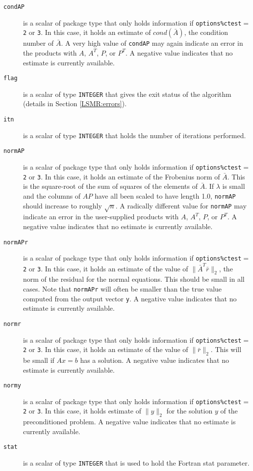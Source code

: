 \begin{description}

\item[\texttt{condAP}]  is a scalar of package type that
   only holds information if {\tt options\%ctest}$ =${\tt 2} or {\tt 3}.
   In this case, it holds an estimate of $cond(\bar{A})$, the condition
   number of $\bar{A}$.  A very high value of {\tt condAP}
   may again indicate an error in the products 
   with $A$, $A^T$, $P$, or $P^T$. A negative value indicates
   that no estimate is currently available.

\item[\texttt{flag}] is a scalar of type  {\tt INTEGER} that gives the exit
   status of the algorithm (details in Section \ref{LSMR:errors}).

\item[\texttt{itn}] is a scalar of type  {\tt INTEGER} that holds the number
   of iterations performed.

\item[\texttt{normAP}]  is a scalar of package type that
   only holds information if {\tt options\%ctest}$ =${\tt 2} or {\tt 3}.
   In this case, it holds an estimate of the Frobenius norm of $\bar{A}$.
   This is the square-root of the sum of squares of the elements of $\bar{A}$.
   If $\lambda$ is small and the columns of $AP$ have all been scaled to have 
   length 1.0, {\tt normAP} should increase to roughly $\sqrt{n}$.
   A radically different value for {\tt normAP} may
   indicate an error in the user-supplied
   products with $A$, $A^T$, $P$, or $P^T$. A negative value
   indicates that no estimate is currently available.

\item[\texttt{normAPr}]  is a scalar of package type that only holds information
   if {\tt options\%ctest}$ =${\tt 2} or {\tt 3}. In this case, it holds an
   estimate of the  value of $\| \bar{A}^T\bar{r}\|_2$, the norm of the residual
   for the normal equations. This should be small in all cases.  Note that
   {\tt normAPr}  will often be smaller than the true value computed from the
   output vector {\tt y}. A negative value indicates that no estimate is
   currently available.
    
\item[\texttt{normr}] is a scalar of package type that
   only holds information if {\tt options\%ctest}$ =${\tt 2} or {\tt 3}.
   In this case, it holds an estimate of the  value of $\|\bar{r}\|_2$.
   This will be small if $Ax = b$ has a solution. A negative value
   indicates that no estimate is currently available.
    
\item[\texttt{normy}] is a scalar of package type that
   only holds information if {\tt options\%ctest}$ =${\tt 2} or {\tt 3}.
   In this case, it holds estimate of  $\|y\|_2$ for the  solution $y$
   of the preconditioned problem.
   A negative value indicates that no estimate is currently available.

\item[\texttt{stat}] is a scalar of type  {\tt INTEGER} that is used to hold
   the Fortran stat parameter.

\end{description}


